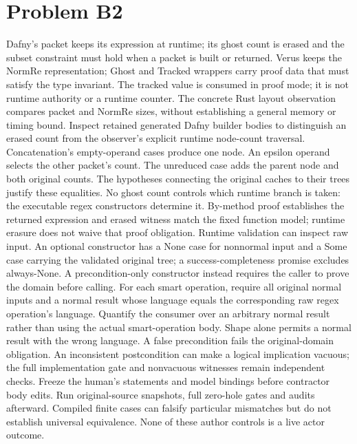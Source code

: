 \documentclass[11pt]{article}
\begin{document}
\section*{Problem B2}\label{ans:B2}
\begin{answer}
Dafny's packet keeps its expression at runtime; its ghost count is erased and
the subset constraint must hold when a packet is built or returned. Verus
keeps the NormRe representation; Ghost and Tracked wrappers carry proof data
that must satisfy the type invariant. The tracked value is consumed in proof
mode; it is not runtime authority or a runtime counter. The concrete Rust
layout observation compares packet and NormRe sizes, without establishing a
general memory or timing bound. Inspect retained generated Dafny builder
bodies to distinguish an erased count from the observer's explicit runtime
node-count traversal.
Concatenation's empty-operand cases produce one node. An epsilon operand
selects the other packet's count. The unreduced case adds the parent node and
both original counts. The hypotheses connecting the original caches to their
trees justify these equalities. No ghost count controls which runtime branch
is taken: the executable regex constructors determine it. By-method proof
establishes the returned expression and erased witness match the fixed function
model; runtime erasure does not waive that proof obligation.
Runtime validation can inspect raw input. An optional constructor has a None
case for nonnormal input and a Some case carrying the validated original tree;
a success-completeness promise excludes always-None. A precondition-only
constructor instead requires the caller to prove the domain before calling.
For each smart operation, require all original normal inputs and a normal
result whose language equals the corresponding raw regex operation's language.
Quantify the consumer over an arbitrary normal result rather than using the
actual smart-operation body. Shape alone permits a normal result with the
wrong language. A false precondition fails the original-domain obligation.
An inconsistent postcondition can make a logical implication vacuous; the
full implementation gate and nonvacuous witnesses remain independent checks.
Freeze the human's statements and model bindings before contractor body edits.
Run original-source snapshots, full zero-hole gates and audits afterward.
Compiled finite cases can falsify particular mismatches but do not establish
universal equivalence. None of these author controls is a live actor outcome.
\end{answer}
\end{document}
